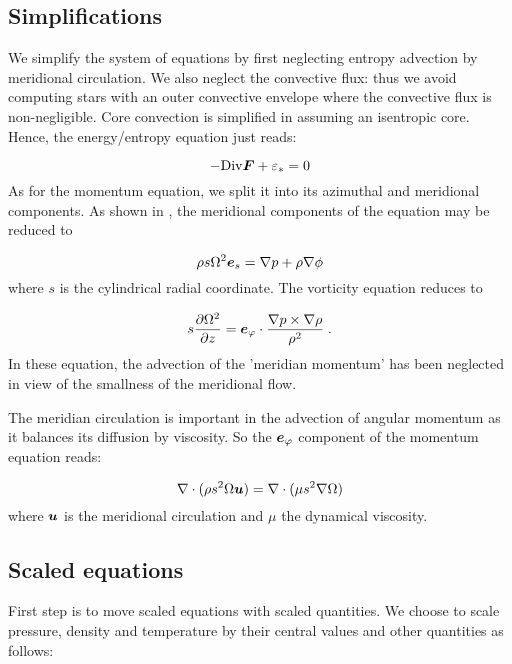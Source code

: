\subsection{Simplifications}

We simplify the system of equations by first neglecting entropy
advection by meridional circulation. We also neglect the convective
flux: thus we avoid computing stars with an outer convective envelope
where the convective flux is non-negligible. Core convection is
simplified in assuming an isentropic core. Hence, the energy/entropy
equation just reads:

\begin{equation} -\Div\vF + \eps_* = 0\end{equation}
As for the momentum equation, we split it into its azimuthal and
meridional components. As shown in \cite{ELR13}, the meridional
components of the equation may be reduced to 

\begin{equation}
\rho s\Omega^2\es=\na p+\rho\na\phi
\label{baroc}
\end{equation}
where $s$ is the cylindrical radial coordinate. The vorticity equation
reduces to

\begin{equation}
\label{eq:vort_inv}
s\frac{\partial\Omega^2}{\partial z}=\ephi\cdot\frac{\na
p\times\na\rho}{\rho^2} \;.
\end{equation}
In these equation, the advection of the 'meridian momentum' has been
neglected in view of the smallness of the meridional flow.

The meridian circulation is important in the advection of angular
momentum as it balances its diffusion by viscosity. So the $\ephi$
component of the momentum equation reads:

\begin{equation}
\label{eq:angular_mom}
\na\cdot{(\rho s^2\Omega\vu)}=\na\cdot (\mu s^2\na\Omega)
\end{equation}
where $\vu$ is the meridional circulation and $\mu$ the dynamical
viscosity.


\subsection{Scaled equations}

First step is to move scaled equations with scaled quantities. We choose
to scale pressure, density and temperature by their central values and
other quantities as follows:


